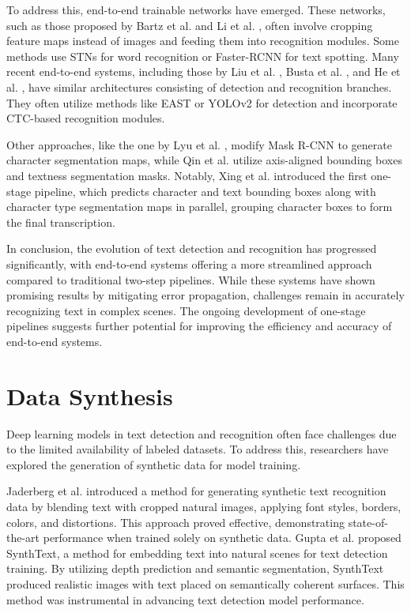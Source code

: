 \documentclass[12pt,twoside]{report}
\begin{document}
To address this, end-to-end trainable networks have emerged. These networks, such as those proposed by Bartz et al. \cite{bartz2017stn} and Li et al. \cite{li2017towards}, often involve cropping feature maps instead of images and feeding them into recognition modules. Some methods use STNs \cite{bartz2017stn} for word recognition or Faster-RCNN \cite{ren2015faster} for text spotting. Many recent end-to-end systems, including those by Liu et al. \cite{liu2018squeezedtext}, Busta et al. \cite{busta2017deep}, and He et al. \cite{he2018end}, have similar architectures consisting of detection and recognition branches. They often utilize methods like EAST \cite{zhou2017east} or YOLOv2 \cite{redmon2016yolo9000} for detection and incorporate CTC-based recognition modules.

Other approaches, like the one by Lyu et al. \cite{lyu2018mask}, modify Mask R-CNN \cite{he2017mask} to generate character segmentation maps, while Qin et al. \cite{qin2019towards} utilize axis-aligned bounding boxes and textness segmentation masks. Notably, Xing et al. \cite{xing2019convolutional} introduced the first one-stage pipeline, which predicts character and text bounding boxes along with character type segmentation maps in parallel, grouping character boxes to form the final transcription.

In conclusion, the evolution of text detection and recognition has progressed significantly, with end-to-end systems offering a more streamlined approach compared to traditional two-step pipelines. While these systems have shown promising results by mitigating error propagation, challenges remain in accurately recognizing text in complex scenes. The ongoing development of one-stage pipelines suggests further potential for improving the efficiency and accuracy of end-to-end systems.

\section{Data Synthesis}
Deep learning models in text detection and recognition often face challenges due to the limited availability of labeled datasets. To address this, researchers have explored the generation of synthetic data for model training.

Jaderberg et al. \cite{jaderberg2014synthetic} introduced a method for generating synthetic text recognition data by blending text with cropped natural images, applying font styles, borders, colors, and distortions. This approach proved effective, demonstrating state-of-the-art performance when trained solely on synthetic data. Gupta et al. \cite{gupta2016synthetic} proposed SynthText, a method for embedding text into natural scenes for text detection training. By utilizing depth prediction and semantic segmentation, SynthText produced realistic images with text placed on semantically coherent surfaces. This method was instrumental in advancing text detection model performance.
\end{document}
